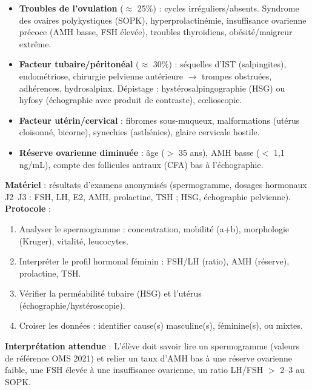 \documentclass[11pt]{article}
\begin{document}
\begin{propriete}
\begin{itemize}
\item \textbf{Troubles de l'ovulation} ($\approx$ 25\%) : cycles irréguliers/absents. Syndrome des ovaires polykystiques (SOPK), hyperprolactinémie, insuffisance ovarienne précoce (AMH basse, FSH élevée), troubles thyroïdiens, obésité/maigreur extrême.
\item \textbf{Facteur tubaire/péritonéal} ($\approx$ 30\%) : séquelles d'IST (salpingites), endométriose, chirurgie pelvienne antérieure $\rightarrow$ trompes obstruées, adhérences, hydrosalpinx. Dépistage : hystérosalpingographie (HSG) ou hyfosy (échographie avec produit de contraste), cœlioscopie.
\item \textbf{Facteur utérin/cervical} : fibromes sous-muqueux, malformations (utérus cloisonné, bicorne), synechies (asthénies), glaire cervicale hostile.
\item \textbf{Réserve ovarienne diminuée} : âge ($>$ 35 ans), AMH basse ($<$ 1,1 ng/mL), compte des follicules antraux (CFA) bas à l'échographie.
\end{itemize}
\end{propriete}

\begin{experience}
\textbf{Matériel} : résultats d'examens anonymisés (spermogramme, dosages hormonaux J2--J3 : FSH, LH, E2, AMH, prolactine, TSH ; HSG, échographie pelvienne).
\textbf{Protocole} :
\begin{enumerate}
\item Analyser le spermogramme : concentration, mobilité (a+b), morphologie (Kruger), vitalité, leucocytes.
\item Interpréter le profil hormonal féminin : FSH/LH (ratio), AMH (réserve), prolactine, TSH.
\item Vérifier la perméabilité tubaire (HSG) et l'utérus (échographie/hystéroscopie).
\item Croiser les données : identifier cause(s) masculine(s), féminine(s), ou mixtes.
\end{enumerate}
\textbf{Interprétation attendue} : L'élève doit savoir lire un spermogramme (valeurs de référence OMS 2021) et relier un taux d'AMH bas à une réserve ovarienne faible, une FSH élevée à une insuffisance ovarienne, un ratio LH/FSH $>$ 2--3 au SOPK.
\end{experience}
\end{document}

